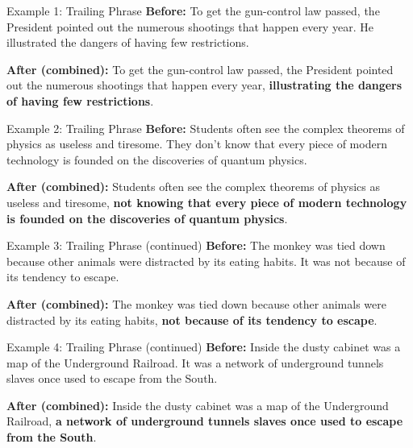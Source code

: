 \documentclass[aspectratio=169,11pt]{beamer}
\begin{document}
\begin{frame}{Example 1: Trailing Phrase}
\small
\textbf{Before:}  
To get the gun-control law passed, the President pointed out the numerous shootings that happen every year.  
He illustrated the dangers of having few restrictions.  

\vspace{0.5em}
\textbf{After (combined):}  
To get the gun-control law passed, the President pointed out the numerous shootings that happen every year, \textbf{illustrating the dangers of having few restrictions}.
\end{frame}

\begin{frame}{Example 2: Trailing Phrase}
\small
\textbf{Before:}  
Students often see the complex theorems of physics as useless and tiresome.  
They don’t know that every piece of modern technology is founded on the discoveries of quantum physics.  

\vspace{0.5em}
\textbf{After (combined):}  
Students often see the complex theorems of physics as useless and tiresome, \textbf{not knowing that every piece of modern technology is founded on the discoveries of quantum physics}.
\end{frame}

\begin{frame}{Example 3: Trailing Phrase (continued)}
\small
\textbf{Before:}  
The monkey was tied down because other animals were distracted by its eating habits.  
It was not because of its tendency to escape.  

\vspace{0.5em}
\textbf{After (combined):}  
The monkey was tied down because other animals were distracted by its eating habits, \textbf{not because of its tendency to escape}.
\end{frame}

\begin{frame}{Example 4: Trailing Phrase (continued)}
\small
\textbf{Before:}  
Inside the dusty cabinet was a map of the Underground Railroad.  
It was a network of underground tunnels slaves once used to escape from the South.  

\vspace{0.5em}
\textbf{After (combined):}  
Inside the dusty cabinet was a map of the Underground Railroad, \textbf{a network of underground tunnels slaves once used to escape from the South}.
\end{frame}
\end{document}
